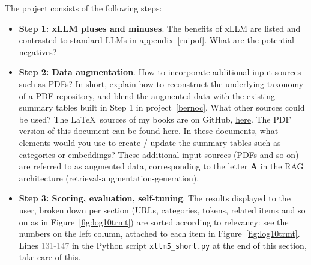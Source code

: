 \documentclass[oneside,10pt]{book}
\begin{document}
\noindent The project consists of the following steps:
\vspace{1ex}
\begin{itemize}
\item[] {\bf Step 1:  xLLM pluses and minuses}. The benefits of xLLM are listed and contrasted to standard LLMs in appendix~\ref{ruipof}. What are the potential negatives?
 \vspace{1ex}
\item[] {\bf Step 2: Data augmentation}. How to incorporate additional input sources  such as PDFs? In short, explain how to reconstruct the 
underlying \textcolor{index}{taxonomy} of a PDF repository, and blend the augmented data with the existing summary tables built in Step 1 in project~\ref{bernoc}. What other sources could be used? The \LaTeX \, sources
 of my books are on GitHub, \href{https://github.com/VincentGranville/Large-Language-Models/tree/main/data_augmentation}{here}. The PDF version of this document can be found \href{https://github.com/VincentGranville/Large-Language-Models/blob/main/Projects4.pdf}{here}. In these documents, what elements would you use to create / update the summary tables such as categories or \textcolor{index}{embeddings}? These additional input sources (PDFs and so on) 
 are referred to as \textcolor{index}{augmented data}, corresponding to the letter {\bf A} in the \textcolor{index}{RAG}  architecture
 (retrieval-augmentation-generation).
\vspace{1ex}
\item[] {\bf Step 3: Scoring, evaluation, self-tuning}. The results displayed to the user, broken down per section (URLs, categories, tokens, related items and so on 
 as in Figure~\ref{fig:log10trmt}) are sorted according to relevancy: see the numbers on the left column, attached to each item in Figure~\ref{fig:log10trmt}. Lines \textcolor{gray}{131-147} in the Python
 script \texttt{xllm5\_short.py} at the end of this section, take care of this. 


\end{itemize}
\end{document}
